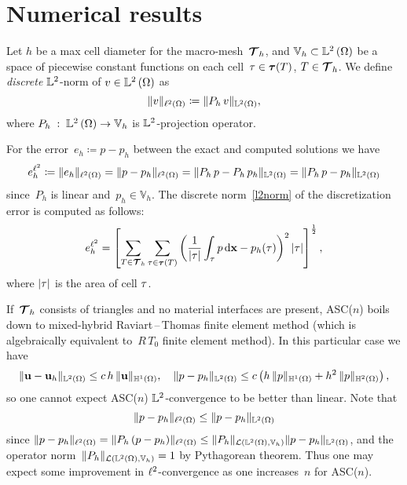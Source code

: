 \section{Numerical results}\label{sec:num}

Let $h$ be a max cell diameter for the macro-mesh~${\boldsymbol{\mathbf{\mathcal T}}}_h$, and $\mathbb V_h \subset {\mathbb L^2\left({\Omega}\right)}$ be a space of piecewise constant
functions on each cell~$\tau \in {\boldsymbol{\mathbf{\mathcal \tau}}}(T)$, $T \in {\boldsymbol{\mathbf{\mathcal T}}}_h$. We define \textit{discrete} ${\mathbb L^2}$-norm of $v \in {\mathbb L^2\left({\Omega}\right)}$ as
\begin{equation}\label{l2}
  \| v \|_{{\ell^2\left({\Omega}\right)}} \coloneqq \| P_h\,v \|_{{\mathbb L^2\left({\Omega}\right)}},
\end{equation}
where $P_h\;:\;{\mathbb L^2\left({\Omega}\right)}\rightarrow\mathbb V_h$ is ${\mathbb L^2}$-projection operator.

For the error~$e_h \coloneqq p - p_h$ between the exact and computed solutions we have
\begin{equation}\label{l2norm}
	e^{{\ell^2}}_{h} \coloneqq \| e_h \|_{{\ell^2\left({\Omega}\right)}} = \| p - p_h \|_{{\ell^2\left({\Omega}\right)}} = \| P_h\,p - P_h\,p_h \|_{{\mathbb L^2\left({\Omega}\right)}} = \| P_h\,p - p_h \|_{{\mathbb L^2\left({\Omega}\right)}}
\end{equation}
since~$P_h$ is linear and~$p_h \in \mathbb V_h$. The discrete norm~\eqref{l2norm} of the discretization error is computed as follows:
$$
	e^{{\ell^2}}_{h} = \left[\sum\limits_{T \in {\boldsymbol{\mathbf{\mathcal T}}}_h}\sum\limits_{\tau\in{\boldsymbol{\mathbf{\mathcal \tau}}}(T)} \left(\frac{1}{|\tau|}\int_{\tau} p \mathop{}\!\mathrm{d}{\boldsymbol{\mathbf{x}}} - p_h(\tau)\right)^2|\tau|\right]^\frac12,
$$
where $|\tau|$ is the area of cell $\tau$.

If~${\boldsymbol{\mathbf{\mathcal T}}}_h$ consists of triangles and no material interfaces are present, ASC($n$) boils down to mixed-hybrid Raviart\,--\,Thomas finite element method (which is algebraically equivalent to~$R\,T_0$ finite element method). In this particular case we have~\cite{M2AN_1980__14_3_249_0}
$$
	\|\boldsymbol{\mathbf{u}} - \boldsymbol{\mathbf{u}}_h\|_{{\mathbb L^2\left({\Omega}\right)}} \le c\,h\,\|\boldsymbol{\mathbf{u}}\|_{{\mathbb H^{1}\left(\Omega\right)}},\quad\|p - p_h\|_{{\mathbb L^2\left({\Omega}\right)}} \le c \left( h\,\|p\|_{{\mathbb H^{1}\left(\Omega\right)}} + h^2\,\|p\|_{{\mathbb H^{2}\left(\Omega\right)}} \right),
$$
so one cannot expect ASC($n$) ${\mathbb L^2}$-convergence to be better than linear. Note that
\begin{equation}\label{l2L2}
	\| p - p_h \|_{{\ell^2\left({\Omega}\right)}} \le \| p - p_h \|_{{\mathbb L^2\left({\Omega}\right)}}
\end{equation}
since $\| p - p_h \|_{{\ell^2\left({\Omega}\right)}} = \| P_h\,(p - p_h) \|_{{\ell^2\left({\Omega}\right)}} \le \|P_h\|_{\mathcal L({\mathbb L^2\left({\Omega}\right)}, \mathbb V_h)} \| p - p_h \|_{{\mathbb L^2\left({\Omega}\right)}}$, and the operator norm~$\|P_h\|_{\mathcal L({\mathbb L^2\left({\Omega}\right)}, \mathbb V_h)} = 1$ by Pythagorean theorem. Thus one may expect some improvement in ${\ell^2}$-convergence as one increases~$n$ for ASC($n$).  

